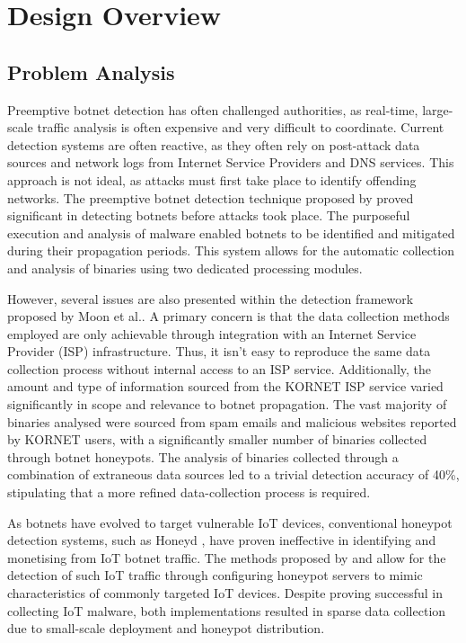 \chapter{Design Overview}

\section{Problem Analysis}

Preemptive botnet detection has often challenged authorities, as real-time, large-scale traffic analysis is often expensive and very difficult to coordinate. Current detection systems are often reactive, as they often rely on post-attack data sources and network logs from Internet Service Providers and DNS services. This approach is not ideal, as attacks must first take place to identify offending networks. The preemptive botnet detection technique proposed by \citet{Moon2012} proved significant in detecting botnets before attacks took place. The purposeful execution and analysis of malware enabled botnets to be identified and mitigated during their propagation periods. This system allows for the automatic collection and analysis of binaries using two dedicated processing modules. 

However, several issues are also presented within the detection framework proposed by Moon et al.. A primary concern is that the data collection methods employed are only achievable through integration with an Internet Service Provider (ISP) infrastructure. Thus, it isn't easy to reproduce the same data collection process without internal access to an ISP service. Additionally, the amount and type of information sourced from the KORNET ISP service varied significantly in scope and relevance to botnet propagation. The vast majority of binaries analysed were sourced from spam emails and malicious websites reported by KORNET users, with a significantly smaller number of binaries collected through botnet honeypots. The analysis of binaries collected through a combination of extraneous data sources led to a trivial detection accuracy of 40\%, stipulating that a more refined data-collection process is required.

As botnets have evolved to target vulnerable IoT devices, conventional honeypot detection systems, such as Honeyd \citep{Honeyd2008}, have proven ineffective in identifying and monetising from IoT botnet traffic. The methods proposed by \citep{PaPa2016} and \citep{Antonakakis2017} allow for the detection of such IoT traffic through configuring honeypot servers to mimic characteristics of commonly targeted IoT devices. Despite proving successful in collecting IoT malware, both implementations resulted in sparse data collection due to small-scale deployment and honeypot distribution. 

